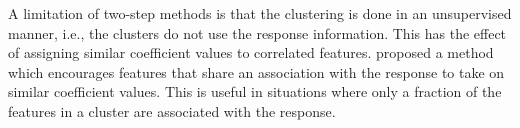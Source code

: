 A limitation of two-step methods is that the clustering is done in an unsupervised manner, i.e., the clusters do not use the response information. 
This has the effect of assigning similar coefficient values to correlated features. 
\cite{witten2014cluster} proposed a method which encourages features that share an association with the response to take on similar coefficient values. 
This is useful in situations where only a fraction of the features in a cluster are associated with the response. 


\begin{comment}
\ctable[caption={Summary of methods used in simulation study},label=tab:methods,pos=h!,doinside=\footnotesize]{LLLLL}{
}{
\FL
General Approach              & Summary Measure of Feature Clusters & Regression Model & Description \ML
Univariate (uni) & NA  & linear model & \multicolumn{1}{m{5cm}}{Fit a joint model on top 5\% most marginally associated predictors}\\
\addlinespace[5pt] 
Penalization (pen)  & NA & ridge, lasso, scad, elasticnet, mcp & \multicolumn{1}{m{5cm}}{no grouping information is used} \\
\addlinespace[5pt] 
Group Penalization (group)  & NA & group lasso & \multicolumn{1}{m{5cm}}{groups are pre-determined via hierarchical clustering on gene expression correlation matrix}\\
\addlinespace[5pt] 
Cluster (clust) & principal component, average, sparse principal component & linear model, lasso, elasticnet & \multicolumn{1}{m{5cm}}{fit model using summary measure of hierarchical clusters as predictors. clusters are automatically chosen using the \texttt{dynamicTreeCut}~\cite{langfelder2008defining} algorithm} \\
\addlinespace[5pt] 
Environment Cluster (Eclust) & principal component, average, sparse principal component & linear model, lasso, elasticnet & \multicolumn{1}{m{5cm}}{use environment to inform the clustering, then fit model on summary measures of the derived clusters. clusters are chosen using \texttt{kmeans} with $K=2$} \\
\LL
}
\end{comment}




